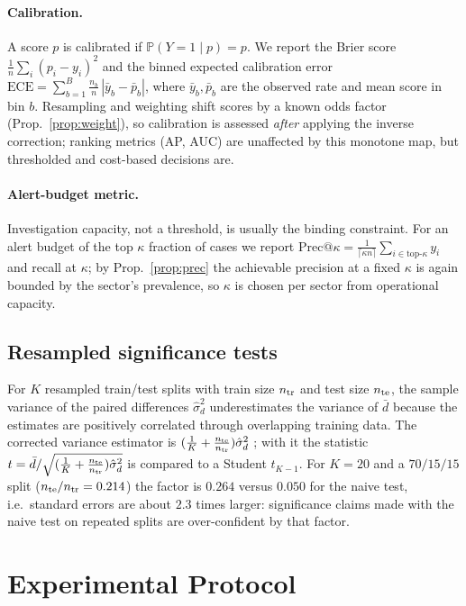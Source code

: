 \documentclass[journal]{IEEEtran}
\newcommand{\Prob}{\mathbb{P}}
\newcommand{\1}{\mathbf{1}}
\begin{document}
\paragraph{Calibration.} A score $p$ is calibrated if $\Prob(Y{=}1\mid p)=p$. We report the Brier score $\tfrac1n\sum_i(p_i-y_i)^2$ and the binned expected calibration error $\mathrm{ECE}=\sum_{b=1}^{B}\tfrac{n_b}{n}\,|\bar y_b-\bar p_b|$, where $\bar y_b,\bar p_b$ are the observed rate and mean score in bin $b$. Resampling and weighting shift scores by a known odds factor (Prop.~\ref{prop:weight}), so calibration is assessed \emph{after} applying the inverse correction; ranking metrics (AP, AUC) are unaffected by this monotone map, but thresholded and cost-based decisions are.

\paragraph{Alert-budget metric.} Investigation capacity, not a threshold, is usually the binding constraint. For an alert budget of the top $\kappa$ fraction of cases we report $\mathrm{Prec@}\kappa=\tfrac{1}{\lceil\kappa n\rceil}\sum_{i\in\text{top-}\kappa}y_i$ and recall at $\kappa$; by Prop.~\ref{prop:prec} the achievable precision at a fixed $\kappa$ is again bounded by the sector's prevalence, so $\kappa$ is chosen per sector from operational capacity.

\subsection{Resampled significance tests}
For $K$ resampled train/test splits with train size $n_{\rm tr}$ and test size $n_{\rm te}$, the sample variance of the paired differences $\hat\sigma_d^2$ underestimates the variance of $\bar d$ because the estimates are positively correlated through overlapping training data. The corrected variance estimator is $(\tfrac1K+\tfrac{n_{\rm te}}{n_{\rm tr}})\hat\sigma_d^2$ \cite{nadeau2003inference}; with it the statistic $t=\bar d/\sqrt{(\tfrac1K+\tfrac{n_{\rm te}}{n_{\rm tr}})\hat\sigma_d^2}$ is compared to a Student $t_{K-1}$. For $K=20$ and a $70/15/15$ split ($n_{\rm te}/n_{\rm tr}=0.214$) the factor is $0.264$ versus $0.050$ for the naive test, i.e.\ standard errors are about $2.3$ times larger: significance claims made with the naive test on repeated splits are over-confident by that factor.

\section{Experimental Protocol}\label{sec:protocol}
\end{document}
